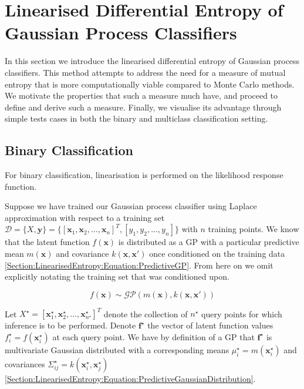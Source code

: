 \documentclass{article}
\renewcommand{\vec}[1]{\boldsymbol{#1}}
\begin{document}
					

		


		
\section{Linearised Differential Entropy of Gaussian Process Classifiers}
\label{Section:LinearisedEntropy}

	In this section we introduce the linearised differential entropy of Gaussian process classifiers. This method attempts to address the need for a measure of mutual entropy that is more computationally viable compared to Monte Carlo methods. We motivate the properties that such a measure much have, and proceed to define and derive such a measure. Finally, we visualise its advantage through simple tests cases in both the binary and multiclass classification setting.
	
	\subsection{Binary Classification}

		For binary classification, linearisation is performed on the likelihood response function.
	
		Suppose we have trained our Gaussian process classifier using Laplace approximation with respect to a training set $\mathcal{D} = \{X, \vec{y}\} = \{[ \vec{x}_{1}, \vec{x}_{2}, \dots, \vec{x}_{n}]^{T}, [y_{1}, y_{2}, \dots, y_{n}]\}$ with $n$ training points. We know that the latent function $f(\vec{x})$ is distributed as a GP with a particular predictive mean $m(\vec{x})$ and covariance $k(\vec{x}, \vec{x}')$ once conditioned on the training data \eqref{Section:LinearisedEntropy:Equation:PredictiveGP}. From here on we omit explicitly notating the training set that was conditioned upon.
		
		\begin{equation}
			f(\vec{x}) \sim \mathcal{GP}(m(\vec{x}), k(\vec{x}, \vec{x}'))
		\label{Section:LinearisedEntropy:Equation:PredictiveGP}
		\end{equation}
		
		Let $X^{\star} = [ \vec{x}^{\star}_{1}, \vec{x}^{\star}_{2}, \dots, \vec{x}^{\star}_{n^{\star}}]^{T}$ denote the collection of $n^{\star}$ query points for which inference is to be performed. Denote $\vec{f}^{\star}$ the vector of latent function values $f^{\star}_{i} = f(\vec{x}^{\star}_{i})$ at each query point. We have by definition of a GP that $\vec{f}^{\star}$ is multivariate Gaussian distributed with a corresponding means $\mu^{\star}_{i} = m(\vec{x}^{\star}_{i})$ and covariances $\Sigma^{\star}_{ij} = k(\vec{x}^{\star}_{i}, \vec{x}^{\star}_{j})$ \eqref{Section:LinearisedEntropy:Equation:PredictiveGaussianDistribution}.
		
\end{document}
